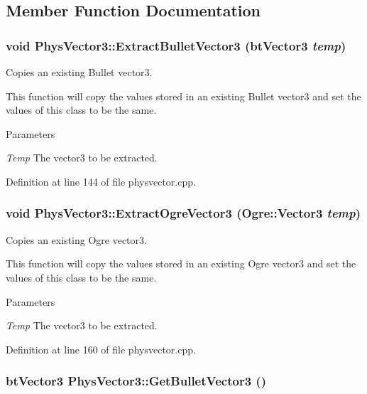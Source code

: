 \subsection{Member Function Documentation}
\hypertarget{classPhysVector3_a71a78da9e8011cb727010f8ba3acf546}{
\subsubsection[{ExtractBulletVector3}]{\setlength{\rightskip}{0pt plus 5cm}void PhysVector3::ExtractBulletVector3 (btVector3 {\em temp})}}
\label{da/d11/classPhysVector3_a71a78da9e8011cb727010f8ba3acf546}


Copies an existing Bullet vector3. 

This function will copy the values stored in an existing Bullet vector3 and set the values of this class to be the same. 
\begin{DoxyParams}{Parameters}
\item[{\em Temp}]The vector3 to be extracted. \end{DoxyParams}


Definition at line 144 of file physvector.cpp.

\hypertarget{classPhysVector3_a422acbc95f72d00a26cb477ab7db5e87}{
\subsubsection[{ExtractOgreVector3}]{\setlength{\rightskip}{0pt plus 5cm}void PhysVector3::ExtractOgreVector3 (Ogre::Vector3 {\em temp})}}
\label{da/d11/classPhysVector3_a422acbc95f72d00a26cb477ab7db5e87}


Copies an existing Ogre vector3. 

This function will copy the values stored in an existing Ogre vector3 and set the values of this class to be the same. 
\begin{DoxyParams}{Parameters}
\item[{\em Temp}]The vector3 to be extracted. \end{DoxyParams}


Definition at line 160 of file physvector.cpp.

\hypertarget{classPhysVector3_adfc5f9e933a94be994ce5ce0c38d1f96}{
\subsubsection[{GetBulletVector3}]{\setlength{\rightskip}{0pt plus 5cm}btVector3 PhysVector3::GetBulletVector3 ()}}
\label{da/d11/classPhysVector3_adfc5f9e933a94be994ce5ce0c38d1f96}


